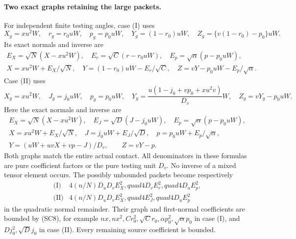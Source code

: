 \paragraph{Two exact graphs retaining the large packets.}
For independent finite testing angles, case (I) uses
\[
 X_g=xu^2W,\quad r_g=r_0uW,\quad p_g=p_0uW,
 \quad Y_g=(1-r_0)uW,\quad Z_g=\{v(1-r_0)-p_0\}uW.    \tag{SC9}
\]
Its exact normals and inverse are
\[
\begin{gathered}
 E_X=\sqrt N(X-xu^2W),\quad E_r=\sqrt C(r-r_0uW),
 \quad E_p=\sqrt\alpha(p-p_0uW),\\
 X=xu^2W+E_X/\sqrt N,\quad
 Y=(1-r_0)uW-E_r/\sqrt C,\quad
 Z=vY-p_0uW-E_p/\sqrt\alpha.                         \tag{SC10}
\end{gathered}
\]
Case (II) uses
\[
 X_g=xu^2W,\quad J_g=j_0uW,\quad p_g=p_0uW,
 \quad Y_g=\frac{u(1-j_0+vp_0+xu^2v)}{D_v}W,
 \quad Z_g=vY_g-p_0uW.                              \tag{SC11}
\]
Here the exact normals and inverse are
\[
\begin{gathered}
 E_X=\sqrt N(X-xu^2W),\quad E_J=\sqrt D(J-j_0uW),
 \quad E_p=\sqrt\alpha(p-p_0uW),\\
 X=xu^2W+E_X/\sqrt N,\quad J=j_0uW+E_J/\sqrt D,
 \quad p=p_0uW+E_p/\sqrt\alpha,\\
 Y=(uW+uvX+vp-J)/D_v,\qquad Z=vY-p.                 \tag{SC12}
\end{gathered}
\]
Both graphs match the entire actual contact. All denominators in
these formulas are pure coefficient factors or the pure testing
unit $D_v$. No inverse of a mixed tensor element occurs.
The possibly unbounded packets become respectively
\[
\begin{array}{ll}
 \text{(I)}&4(n/N)D_uD_vE_X^2,quad4D_vE_r^2,quad4D_uE_p^2,\\
 \text{(II)}&4(n/N)D_uD_vE_X^2,quad4E_J^2,quad4D_uE_p^2
\end{array}
\]
in the quadratic normal remainder. Their graph and first-normal
coefficients are bounded by (SC8), for example
$nx,nx^2,Cr_0^2,\sqrt C r_0,\alpha p_0^2,\sqrt\alpha p_0$
in case (I), and $Dj_0^2,\sqrt D j_0$ in case (II).
Every remaining source coefficient is bounded.

